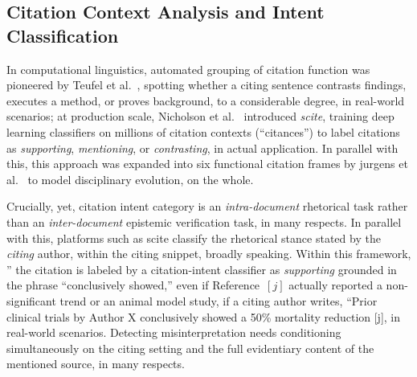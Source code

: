\documentclass[sigconf]{acmart}
\begin{document}
\subsection{Citation Context Analysis and Intent Classification}
In computational linguistics, automated grouping of citation function was pioneered by Teufel et al.\ \cite{teufel2006automatic}, spotting whether a citing sentence contrasts findings, executes a method, or proves background, to a considerable degree, in real-world scenarios; at production scale, Nicholson et al.\ \cite{nicholson2021scite} introduced \emph{scite}, training deep learning classifiers on millions of citation contexts (``citances'') to label citations as \emph{supporting}, \emph{mentioning}, or \emph{contrasting}, in actual application. In parallel with this, this approach was expanded into six functional citation frames by jurgens et al.\ \cite{jurgens2018measuring} to model disciplinary evolution, on the whole.

Crucially, yet, citation intent category is an \emph{intra-document} rhetorical task rather than an \emph{inter-document} epistemic verification task, in many respects. In parallel with this, platforms such as scite \cite{nicholson2021scite} classify the rhetorical stance stated by the \emph{citing} author, within the citing snippet, broadly speaking. Within this framework, '' the citation is labeled by a citation-intent classifier as \emph{supporting} grounded in the phrase ``conclusively showed,'' even if Reference~$[j]$ actually reported a non-significant trend or an animal model study, if a citing author writes, ``Prior clinical trials by Author X conclusively showed a 50\% mortality reduction [j], in real-world scenarios. Detecting misinterpretation needs conditioning simultaneously on the citing setting and the full evidentiary content of the mentioned source, in many respects.
\end{document}
